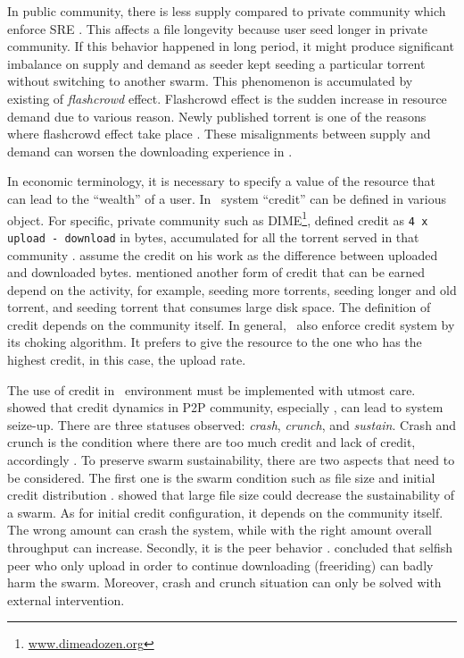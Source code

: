 In public community, there is less supply compared to private community which enforce SRE \cite{2009:demandsupplyres:andrade}. This affects a file longevity because user seed longer in private community. If this behavior happened in long period, it might produce significant imbalance on supply and demand as seeder kept seeding a particular torrent without switching to another swarm. This phenomenon is accumulated by existing of \textit{flashcrowd} effect. Flashcrowd effect is the sudden increase in resource demand due to various reason. Newly published torrent is one of the reasons where flashcrowd effect take place \cite{2013:swarmevolution:su}. These misalignments between supply and demand can worsen the downloading experience in \bt.

In economic terminology, it is necessary to specify a value of the resource that can lead to the ``wealth'' of a user. In \bt~system ``credit'' can be defined in various object. For specific, private community such as DIME\footnote{\url{www.dimeadozen.org}}, \citeauthor{2012:economicbt:kash}  defined credit as \texttt{4 x upload - download} in bytes, accumulated for all the torrent served in that community \cite{2012:economicbt:kash}. \citeauthor{2015:creditmining:capota} assume the credit on his work as the difference between uploaded and downloaded bytes. \citeauthor{2014:sustainabilitytorrent:chen} mentioned another form of credit that can be earned depend on the activity, for example, seeding more torrents, seeding longer and old torrent, and seeding torrent that consumes large disk space\cite{2014:sustainabilitytorrent:chen}. The definition of credit depends on the community itself. In general, \bt~also enforce credit system by its choking algorithm. It prefers to give the resource to the one who has the highest credit, in this case, the upload rate.

The use of credit in \bt~environment must be implemented with utmost care. \citeauthor{2010:crashsustain:rahman} showed that credit dynamics in P2P community, especially \bt, can lead to system seize-up. There are three statuses observed: \textit{crash}, \textit{crunch}, and \textit{sustain}. Crash and crunch is the condition where there are too much credit and lack of credit, accordingly \cite{2015:sustainabilitypt:vinko}. To preserve swarm sustainability, there are two aspects that need to be considered. The first one is the swarm condition such as file size and initial credit distribution \cite{2015:sustainabilitypt:vinko}. \citeauthor{2015:sustainabilitypt:vinko} showed that large file size could decrease the sustainability of a swarm. As for initial credit configuration, it depends on the community itself. The wrong amount can crash the system, while with the right amount overall throughput can increase. Secondly, it is the peer behavior \cite{2010:crashsustain:rahman}. \citeauthor{2010:crashsustain:rahman} concluded that selfish peer who only upload in order to continue downloading (freeriding) can badly harm the swarm. Moreover, crash and crunch situation can only be solved with external intervention.


